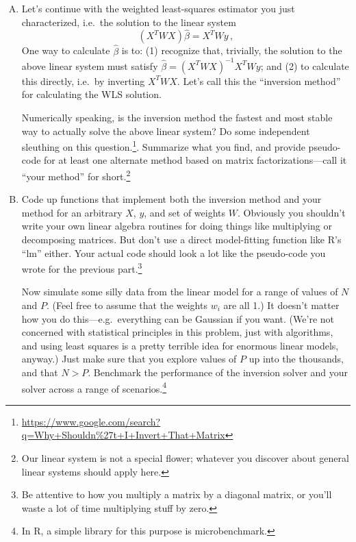 \documentclass{mynotes}
\begin{document}
\begin{enumerate}[(A)]

\item Let's continue with the weighted least-squares estimator you just characterized, i.e.~the solution to the linear system
$$
(X^T W X) \hat \beta = X^T W y \, ,
$$
One way to calculate $\hat{\beta}$ is to: (1) recognize that, trivially, the solution to the above linear system must satisfy $\hat \beta = (X^T W X)^{-1} X^T W y$; and (2) to calculate this directly, i.e.~by inverting $X^T W X$.  Let's call this the ``inversion method'' for calculating the WLS solution.

Numerically speaking, is the inversion method the fastest and most stable way to actually solve the above linear system?  Do some independent sleuthing on this question.\footnote{\url{https://www.google.com/search?q=Why+Shouldn\%27t+I+Invert+That+Matrix}}.   Summarize what you find, and provide pseudo-code for at least one alternate method based on matrix factorizations---call it ``your method'' for short.\footnote{Our linear system is not a special flower; whatever you discover about general linear systems should apply here.}

\item Code up functions that implement both the inversion method and your method for an arbitrary $X$, $y$, and set of weights $W$.  Obviously you shouldn't write your own linear algebra routines for doing things like multiplying or decomposing matrices.  But don't use a direct model-fitting function like R's ``lm'' either.   Your actual code should look a lot like the pseudo-code you wrote for the previous part.\footnote{Be attentive to how you multiply a matrix by a diagonal matrix, or you'll waste a lot of time multiplying stuff by zero.}

Now simulate some silly data from the linear model for a range of values of $N$ and $P$.  (Feel free to assume that the weights $w_i$ are all 1.)  It doesn't matter how you do this---e.g.~everything can be Gaussian if you want.  (We're not concerned with statistical principles in this problem, just with algorithms, and using least squares is a pretty terrible idea for enormous linear models, anyway.)  Just make sure that you explore values of $P$ up into the thousands, and that $N > P$.  Benchmark the performance of the inversion solver and your solver across a range of scenarios.\footnote{In R, a simple library for this purpose is microbenchmark.}

\end{enumerate}
\end{document}
